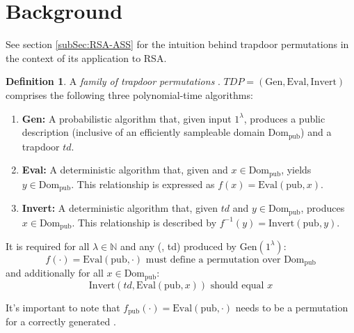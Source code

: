 \documentclass[]{final_report}
\theoremstyle{definition}
\newtheorem{definition}{Definition}[chapter]
\begin{document}

\section{Background}
See section \ref{subSec:RSA-ASS} for the intuition behind trapdoor permutations in the context of its application to RSA.
\begin{definition}
\label{def:TDP}
A \textit{family of trapdoor permutations} \cite{10.1145/147508.147537}. \( TDP = (\text{Gen}, \text{Eval}, \text{Invert}) \) comprises the following three polynomial-time algorithms:
\begin{enumerate}
    \item \textbf{Gen:} A probabilistic algorithm that, given input \( 1^{\lambda} \), produces a public description  (inclusive of an efficiently sampleable domain \( \text{Dom}_{\text{pub}} \)) and a trapdoor \( td \).
    
    \item \textbf{Eval:} A deterministic algorithm that, given  and \( x \in \text{Dom}_{\text{pub}} \), yields \( y \in \text{Dom}_{\text{pub}} \). This relationship is expressed as \( f(x) = \text{Eval}(\text{pub}, x) \).
    
    \item \textbf{Invert:} A deterministic algorithm that, given \( td \) and \( y \in \text{Dom}_{\text{pub}} \), produces \( x \in \text{Dom}_{\text{pub}} \). This relationship is described by \( f^{-1}(y) = \text{Invert}(\text{pub}, y) \).
\end{enumerate}

It is required for all \( \lambda \in \mathbb{N} \) and any (, td) produced by \(\text{Gen}(1^{\lambda})\):
\[ f(\cdot) = \text{Eval}(\text{pub}, \cdot) \text{ must define a permutation over } \text{Dom}_{\text{pub}} \]
and additionally for all \( x \in \text{Dom}_{\text{pub}} \):
\[ \text{Invert}(td, \text{Eval}(\text{pub}, x)) \text{ should equal } x \]

It's important to note that \( f_{\text{pub}}(\cdot) = \text{Eval}(\text{pub}, \cdot) \) needs to be a permutation for a correctly generated . 
\end{definition}
\end{document}
